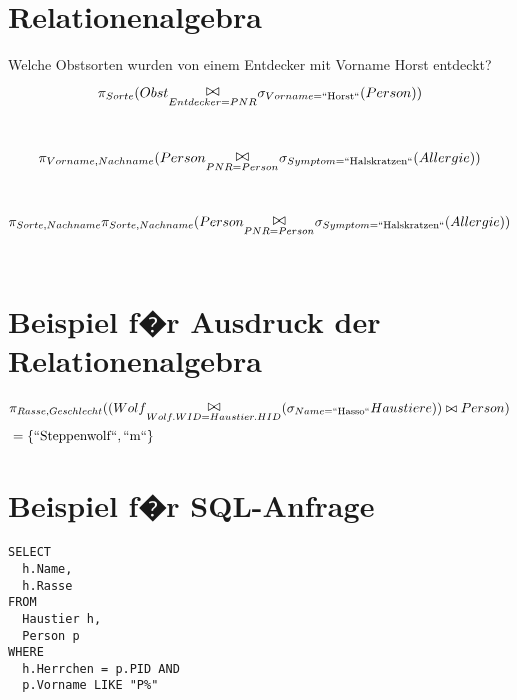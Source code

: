\documentclass[ngerman]{gdb-aufgabenblatt}
\begin{document}
\section{Relationenalgebra}

\begin{compactenum}[(a)]
	\item Welche Obstsorten wurden von einem Entdecker mit Vorname Horst entdeckt? 
	\begin{align*}
	 &\projektion{Sorte}(Obst\verbund{Entdecker=PNR} \selektion{Vorname=\wert{Horst}}(Person))
	\\  
\end{align*}\
	\item 
	\begin{align*}
 	&\projektion{Vorname,Nachname}(Person\verbund{PNR=Person} \selektion{Symptom=\wert{Halskratzen}}(Allergie))
	\\  
\end{align*}\\
\item 
	\begin{align*}
 	&\projektion{Sorte,Nachname}\projektion{Sorte,Nachname}(Person\verbund{PNR=Person} \selektion{Symptom=\wert{Halskratzen}}(Allergie))
	\\  
\end{align*}\
\end{compactenum}






\section{Beispiel f�r Ausdruck der Relationenalgebra}

\begin{align*}
 &\projektion{Rasse, Geschlecht}((Wolf\verbund{Wolf.WID=Haustier.HID} (\selektion{Name=\wert{Hasso}}Haustiere)) \natverbund Person)
\\  &=\{ \wert{Steppenwolf}, \wert{m} \}
\end{align*}




\newpage
\section{Beispiel f�r SQL-Anfrage}

\begin{verbatim}
SELECT 
  h.Name,
  h.Rasse
FROM 
  Haustier h,
  Person p
WHERE
  h.Herrchen = p.PID AND
  p.Vorname LIKE "P%"
\end{verbatim}
\end{document}
